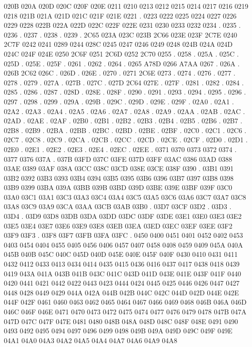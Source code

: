 020B 020A
020D 020C
020F 020E
0211 0210
0213 0212
0215 0214
0217 0216
0219 0218
021B 021A
021D 021C
021F 021E
0221 .
0223 0222
0225 0224
0227 0226
0229 0228
022B 022A
022D 022C
022F 022E
0231 0230
0233 0232
0234 .
0235 .
0236 .
0237 .
0238 .
0239 .
2C65 023A
023C 023B
2C66 023E
023F 2C7E
0240 2C7F
0242 0241
0289 0244
028C 0245
0247 0246
0249 0248
024B 024A
024D 024C
024F 024E
0250 2C6F
0251 2C6D
0252 2C70
0255 .
0258 .
025A .
025C .
025D .
025E .
025F .
0261 .
0262 .
0264 .
0265 A78D
0266 A7AA
0267 .
026A .
026B 2C62
026C .
026D .
026E .
0270 .
0271 2C6E
0273 .
0274 .
0276 .
0277 .
0278 .
0279 .
027A .
027B .
027C .
027D 2C64
027E .
027F .
0281 .
0282 .
0284 .
0285 .
0286 .
0287 .
028D .
028E .
028F .
0290 .
0291 .
0293 .
0294 .
0295 .
0296 .
0297 .
0298 .
0299 .
029A .
029B .
029C .
029D .
029E .
029F .
02A0 .
02A1 .
02A2 .
02A3 .
02A4 .
02A5 .
02A6 .
02A7 .
02A8 .
02A9 .
02AA .
02AB .
02AC .
02AD .
02AE .
02AF .
02B0 .
02B1 .
02B2 .
02B3 .
02B4 .
02B5 .
02B6 .
02B7 .
02B8 .
02B9 .
02BA .
02BB .
02BC .
02BD .
02BE .
02BF .
02C0 .
02C1 .
02C6 .
02C7 .
02C8 .
02C9 .
02CA .
02CB .
02CC .
02CD .
02CE .
02CF .
02D0 .
02D1 .
02E0 .
02E1 .
02E2 .
02E3 .
02E4 .
02EC .
02EE .
0371 0370
0373 0372
0374 .
0377 0376
037A .
037B 03FD
037C 03FE
037D 03FF
03AC 0386
03AD 0388
03AE 0389
03AF 038A
03CC 038C
03CD 038E
03CE 038F
0390 .
03B1 0391
03B2 0392
03B3 0393
03B4 0394
03B5 0395
03B6 0396
03B7 0397
03B8 0398
03B9 0399
03BA 039A
03BB 039B
03BD 039D
03BE 039E
03BF 039F
03C0 03A0
03C1 03A1
03C3 03A3
03C4 03A4
03C5 03A5
03C6 03A6
03C7 03A7
03C8 03A8
03C9 03A9
03CA 03AA
03CB 03AB
03B0 .
03D7 03CF
03D2 .
03D3 .
03D4 .
03D9 03D8
03DB 03DA
03DD 03DC
03DF 03DE
03E1 03E0
03E3 03E2
03E5 03E4
03E7 03E6
03E9 03E8
03EB 03EA
03ED 03EC
03EF 03EE
03F2 03F9
03F3 .
03F8 03F7
03FB 03FA
03FC .
0450 0400
0451 0401
0452 0402
0453 0403
0454 0404
0455 0405
0456 0406
0457 0407
0458 0408
0459 0409
045A 040A
045B 040B
045C 040C
045D 040D
045E 040E
045F 040F
0430 0410
0431 0411
0432 0412
0433 0413
0434 0414
0435 0415
0436 0416
0437 0417
0438 0418
0439 0419
043A 041A
043B 041B
043C 041C
043D 041D
043E 041E
043F 041F
0440 0420
0441 0421
0442 0422
0443 0423
0444 0424
0445 0425
0446 0426
0447 0427
0448 0428
0449 0429
044A 042A
044B 042B
044C 042C
044D 042D
044E 042E
044F 042F
0461 0460
0463 0462
0465 0464
0467 0466
0469 0468
046B 046A
046D 046C
046F 046E
0471 0470
0473 0472
0475 0474
0477 0476
0479 0478
047B 047A
047D 047C
047F 047E
0481 0480
048B 048A
048D 048C
048F 048E
0491 0490
0493 0492
0495 0494
0497 0496
0499 0498
049B 049A
049D 049C
049F 049E
04A1 04A0
04A3 04A2
04A5 04A4
04A7 04A6
04A9 04A8
